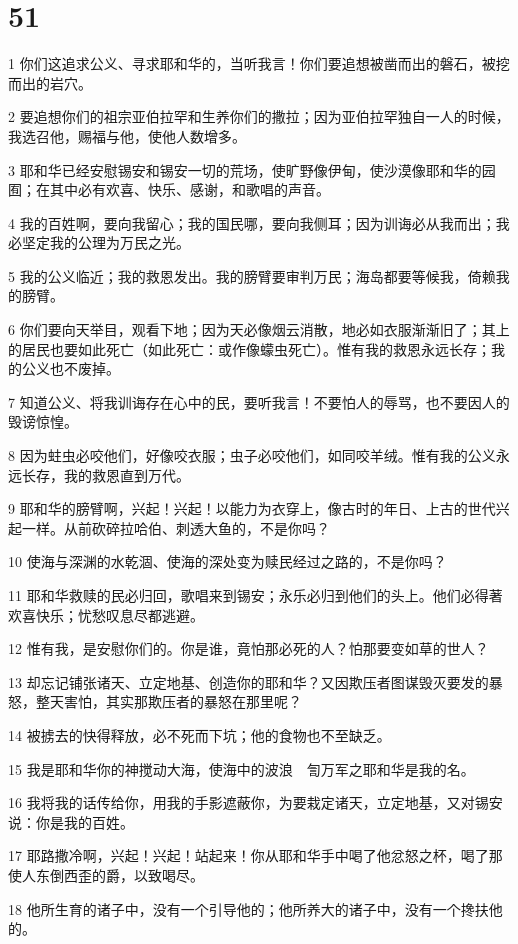 \chapter{51}

\par 1 你们这追求公义、寻求耶和华的，当听我言！你们要追想被凿而出的磐石，被挖而出的岩穴。
\par 2 要追想你们的祖宗亚伯拉罕和生养你们的撒拉；因为亚伯拉罕独自一人的时候，我选召他，赐福与他，使他人数增多。
\par 3 耶和华已经安慰锡安和锡安一切的荒场，使旷野像伊甸，使沙漠像耶和华的园囿；在其中必有欢喜、快乐、感谢，和歌唱的声音。
\par 4 我的百姓啊，要向我留心；我的国民哪，要向我侧耳；因为训诲必从我而出；我必坚定我的公理为万民之光。
\par 5 我的公义临近；我的救恩发出。我的膀臂要审判万民；海岛都要等候我，倚赖我的膀臂。
\par 6 你们要向天举目，观看下地；因为天必像烟云消散，地必如衣服渐渐旧了；其上的居民也要如此死亡（如此死亡：或作像蠓虫死亡）。惟有我的救恩永远长存；我的公义也不废掉。
\par 7 知道公义、将我训诲存在心中的民，要听我言！不要怕人的辱骂，也不要因人的毁谤惊惶。
\par 8 因为蛀虫必咬他们，好像咬衣服；虫子必咬他们，如同咬羊绒。惟有我的公义永远长存，我的救恩直到万代。
\par 9 耶和华的膀臂啊，兴起！兴起！以能力为衣穿上，像古时的年日、上古的世代兴起一样。从前砍碎拉哈伯、刺透大鱼的，不是你吗？
\par 10 使海与深渊的水乾涸、使海的深处变为赎民经过之路的，不是你吗？
\par 11 耶和华救赎的民必归回，歌唱来到锡安；永乐必归到他们的头上。他们必得著欢喜快乐；忧愁叹息尽都逃避。
\par 12 惟有我，是安慰你们的。你是谁，竟怕那必死的人？怕那要变如草的世人？
\par 13 却忘记铺张诸天、立定地基、创造你的耶和华？又因欺压者图谋毁灭要发的暴怒，整天害怕，其实那欺压者的暴怒在那里呢？
\par 14 被掳去的快得释放，必不死而下坑；他的食物也不至缺乏。
\par 15 我是耶和华你的神搅动大海，使海中的波浪　訇万军之耶和华是我的名。
\par 16 我将我的话传给你，用我的手影遮蔽你，为要栽定诸天，立定地基，又对锡安说：你是我的百姓。
\par 17 耶路撒冷啊，兴起！兴起！站起来！你从耶和华手中喝了他忿怒之杯，喝了那使人东倒西歪的爵，以致喝尽。
\par 18 他所生育的诸子中，没有一个引导他的；他所养大的诸子中，没有一个搀扶他的。
